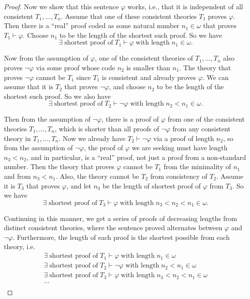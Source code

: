 \documentclass{article}
\begin{document}
\begin{enumerate}[label={\bf Q\arabic*:}]
\begin{proof}
      Now we show that this sentence $\varphi$ works, i.e., that it is
      independent of all consistent $T_1,\ldots,T_n$. Assume that one of
      these consistent theories $T_1$ proves $\varphi$. Then there is a
      ``real'' proof coded as some natural number $n_1\in\omega$ that
      proves $T_1\vdash\varphi$. Choose $n_1$ to be the length of the
      shortest such proof. So we have
      \[\exists\; \text{shortest proof of}\; T_1\vdash\varphi\; \text{with
      length}\; n_1\in\omega.\]

      Now from the assumption of $\varphi$, one of the consistent theories
      of $T_1,\ldots,T_n$ also proves $\neg\varphi$ via some proof whose
      code $n_2$ is smaller than $n_1$. The theory that proves
      $\neg\varphi$ cannot be $T_1$ since $T_1$ is consistent and already
      proves $\varphi$. We can assume that it is $T_2$ that proves
      $\neg\varphi$, and choose $n_2$ to be the length of the shortest such
      proof. So we also have
      \[\exists\; \text{shortest proof of}\; T_2\vdash\neg\varphi\;
      \text{with length}\; n_2<n_1\in\omega.\]

      Then from the assumption of $\neg\varphi$, there is a proof of
      $\varphi$ from one of the consistent theories $T_1,\ldots,T_n$, which
      is shorter than all proofs of $\neg\varphi$ from any consistent
      theory in $T_1,\ldots,T_n$. Now we already have
      $T_2\vdash\neg\varphi$ via a proof of length $n_2$, so from the
      assumption of $\neg\varphi$, the proof of $\varphi$ we are seeking
      must have length $n_3<n_2$, and in particular, is a ``real'' proof,
      not just a proof from a non-standard number. Then the theory that
      proves $\varphi$ cannot be $T_1$ from the minimality of $n_1$ and
      from $n_3<n_1$. Also, the theory cannot be $T_2$ from consistency of
      $T_2$. Assume it is $T_3$ that proves $\varphi$, and let $n_3$ be the
      length of shortest proof of $\varphi$ from $T_3$. So we have
      \[\exists\; \text{shortest proof of}\; T_3\vdash\varphi\;
      \text{with length}\; n_3<n_2<n_1\in\omega.\]

      Continuing in this manner, we get a series of proofs of decreasing
      lengths from distinct consistent theories, where the sentence proved
      alternates between $\varphi$ and $\neg\varphi$. Furthermore, the
      length of each proof is the shortest possible from each theory, i.e.
      \[\begin{array}{l}
        \exists\; \text{shortest proof of}\; T_1\vdash\varphi\; \text{with
        length}\; n_1\in\omega\\
        \exists\; \text{shortest proof of}\; T_2\vdash\neg\varphi\;
        \text{with length}\; n_2<n_1\in\omega\\
        \exists\; \text{shortest proof of}\; T_3\vdash\varphi\;
        \text{with length}\; n_3<n_2<n_1\in\omega\\
        \ldots\\
      \end{array}\]


\end{proof}
\end{enumerate}
\end{document}
